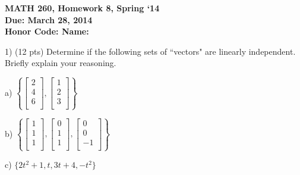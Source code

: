 \documentclass{article}
\begin{document}
\begin{flushleft}
	\bfseries{MATH 260, Homework 8, Spring `14}\\
	\bfseries{Due: March 28, 2014}\\
	\bfseries{Honor Code:} \hspace{3.5in}\bfseries{Name:}\\
\end{flushleft}
\begin{flushleft}
\vspace{.25in}

1) (12 pts) Determine if the following sets of ``vectors" are linearly independent.  Briefly explain your reasoning.

\vspace{0.2in}

a) $\left\{ \begin{bmatrix} 2\\4\\6\\ \end{bmatrix}, \begin{bmatrix} 1\\2\\3\\ \end{bmatrix} \right\}$

\vspace{1.5in}

b) $\left\{ \begin{bmatrix} 1\\1\\1\\ \end{bmatrix}, \begin{bmatrix} 0\\1\\1\\ \end{bmatrix}, \begin{bmatrix} 0\\0\\-1\\\end{bmatrix} \right\}$


\vspace{1.5in}

c) $\{2t^2 + 1, t, 3t + 4, -t^2\}$

\vspace{1.5in}


\end{flushleft}
\end{document}
